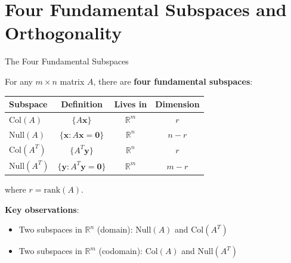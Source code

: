 \documentclass[10pt]{beamer}
\theoremstyle{definition}
\newcommand{\x}[1]{\alert{\textbf{#1}}}
\begin{document}
\section{Four Fundamental Subspaces and Orthogonality}

\begin{frame}{The Four Fundamental Subspaces}

For any $m \times n$ matrix $A$, there are \x{four fundamental subspaces}:

\vspace{1em}

\begin{center}
\begin{tabular}{|l|c|c|c|}
\hline
\textbf{Subspace} & \textbf{Definition} & \textbf{Lives in} & \textbf{Dimension} \\
\hline
$\text{Col}(A)$ & $\{A\mathbf{x}\}$ & $\mathbb{R}^m$ & $r$ \\
$\text{Null}(A)$ & $\{\mathbf{x} : A\mathbf{x} = \mathbf{0}\}$ & $\mathbb{R}^n$ & $n - r$ \\
$\text{Col}(A^T)$ & $\{A^T \mathbf{y}\}$ & $\mathbb{R}^n$ & $r$ \\
$\text{Null}(A^T)$ & $\{\mathbf{y} : A^T \mathbf{y} = \mathbf{0}\}$ & $\mathbb{R}^m$ & $m - r$ \\
\hline
\end{tabular}
\end{center}

\vspace{0.5em}

where $r = \text{rank}(A)$.

\vspace{1em}

\x{Key observations}:
\begin{itemize}
\item Two subspaces in $\mathbb{R}^n$ (domain): $\text{Null}(A)$ and $\text{Col}(A^T)$
\item Two subspaces in $\mathbb{R}^m$ (codomain): $\text{Col}(A)$ and $\text{Null}(A^T)$
\end{itemize}

\end{frame}
\end{document}
